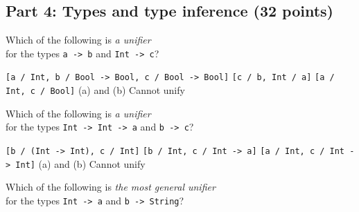 \documentclass[addpoints]{exam}
\begin{document}
\begin{questions}

\newpage

\subsection*{\textbf{Part 4: Types and type inference (32 points)}}

\question[5] Which of the following is \emph{a unifier} \\ for the types \texttt{a -> b} and \texttt{Int -> c}?

\begin{choices}
  \CorrectChoice \texttt{[a / Int, b / Bool -> Bool, c / Bool -> Bool]}
  \choice \texttt{[c / b, Int / a]}
  \choice \texttt{[a / Int, c / Bool]}
  \choice (a) and (b)
  \choice Cannot unify
\end{choices}

\question[5] Which of the following is \emph{a unifier} \\ for the types \texttt{Int -> Int -> a} and \texttt{b -> c}?

\begin{choices}
  \choice \texttt{[b / (Int -> Int), c / Int]}
  \CorrectChoice \texttt{[b / Int, c / Int -> a]}
  \choice \texttt{[a / Int, c / Int -> Int]}
  \choice (a) and (b)
  \choice Cannot unify
\end{choices}

\question[5] Which of the following is \emph{the most general unifier} \\ for the types \texttt{Int -> a} and \texttt{b -> String}?


\end{questions}
\end{document}
